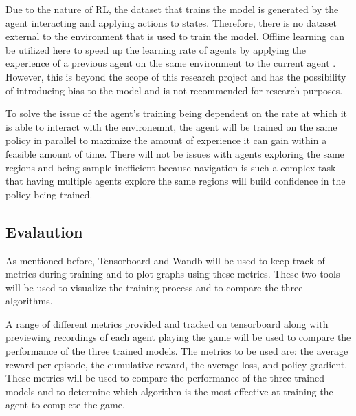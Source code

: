Due to the nature of RL, the dataset that trains the model is generated by the agent interacting and applying actions to states. Therefore, there is no dataset external to the environment that is used to train the model. Offline learning can be utilized here to speed up the learning rate of agents by applying the experience of a previous agent on the same environment to the current agent \cite{Sutton1}. However, this is beyond the scope of this research project and has the possibility of introducing bias to the model and is not recommended for research purposes.

To solve the issue of the agent's training being dependent on the rate at which it is able to interact with the environemnt, the agent will be trained on the same policy in parallel to maximize the amount of experience it can gain within a feasible amount of time. There will not be issues with agents exploring the same regions and being sample inefficient because navigation is such a complex task that having multiple agents explore the same regions will build confidence in the policy being trained.

\subsection{Evalaution}

As mentioned before, Tensorboard and Wandb will be used to keep track of metrics during training and to plot graphs using these metrics. These two tools will be used to visualize the training process and to compare the three algorithms.

A range of different metrics provided and tracked on tensorboard along with previewing recordings of each agent playing the game will be used to compare the performance of the three trained models. The metrics to be used are: the average reward per episode, the cumulative reward, the average loss, and policy gradient. These metrics will be used to compare the performance of the three trained models and to determine which algorithm is the most effective at training the agent to complete the game.